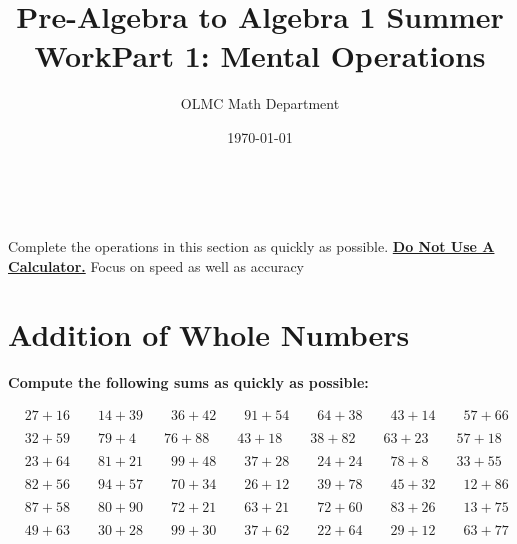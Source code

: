 \documentclass{article}
\title{Pre-Algebra to Algebra 1 Summer Work}
\author{OLMC Math Department}
\date{\today}
\begin{document}
\maketitle
\newpage\
\begin{center}
	\title{{\huge \textbf{Part 1: Mental Operations}} }

Complete the operations in this section as quickly as possible. \textbf{\underline{Do Not Use A Calculator.}} Focus on speed as well as accuracy
\end{center}

\section{Addition of Whole Numbers}

\bigskip

\textbf{Compute the following sums as quickly as possible:}

\bigskip

\(\begin{aligned}
	&27+16 \qquad 14+39 \qquad 36+42 \qquad 91+54 \qquad 64+38 \qquad 43+14 \qquad 57+66 \\\\
	&32+59 \qquad 79+4  \qquad 76+88 \qquad 43+18 \qquad 38+82 \qquad 63+23 \qquad 57+18 \\\\
	&23+64 \qquad 81+21 \qquad 99+48 \qquad 37+28 \qquad 24+24 \qquad 78+8  \qquad 33+55 \\\\
	&82+56 \qquad 94+57 \qquad 70+34 \qquad 26+12 \qquad 39+78 \qquad 45+32 \qquad 12+86 \\\\
	&87+58 \qquad 80+90 \qquad 72+21 \qquad 63+21 \qquad 72+60 \qquad 83+26 \qquad 13+75 \\\\
	&49+63 \qquad 30+28 \qquad 99+30 \qquad 37+62 \qquad 22+64 \qquad 29+12 \qquad 63+77 \\\\
\end{aligned}\)

\bigskip
\end{document}
